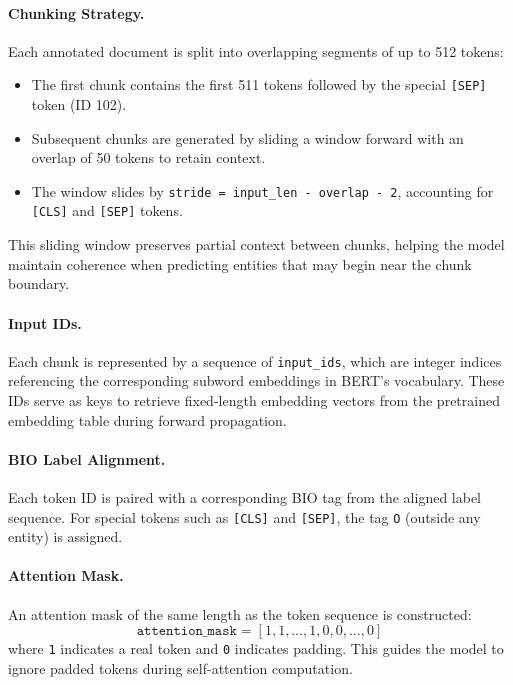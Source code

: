 \documentclass{article}
\begin{document}
\paragraph{Chunking Strategy.}

Each annotated document is split into overlapping segments of up to 512 tokens:
\begin{itemize}
    \item The first chunk contains the first 511 tokens followed by the special \texttt{[SEP]} token (ID 102).
    \item Subsequent chunks are generated by sliding a window forward with an overlap of 50 tokens to retain context.
    \item The window slides by \texttt{stride = input\_len - overlap - 2}, accounting for \texttt{[CLS]} and \texttt{[SEP]} tokens.
\end{itemize}

This sliding window preserves partial context between chunks, helping the model maintain coherence when predicting entities that may begin near the chunk boundary.

\paragraph{Input IDs.}

Each chunk is represented by a sequence of \texttt{input\_ids}, which are integer indices referencing the corresponding subword embeddings in BERT’s vocabulary. These IDs serve as keys to retrieve fixed-length embedding vectors from the pretrained embedding table during forward propagation.

\paragraph{BIO Label Alignment.}

Each token ID is paired with a corresponding BIO tag from the aligned label sequence. For special tokens such as \texttt{[CLS]} and \texttt{[SEP]}, the tag \texttt{O} (outside any entity) is assigned.

\paragraph{Attention Mask.}

An attention mask of the same length as the token sequence is constructed:
\[
\texttt{attention\_mask} = [1, 1, \ldots, 1, 0, 0, \ldots, 0]
\]
where \texttt{1} indicates a real token and \texttt{0} indicates padding. This guides the model to ignore padded tokens during self-attention computation.
\end{document}
